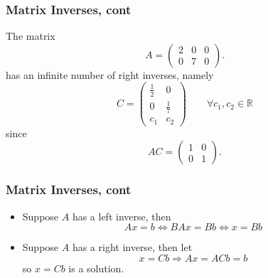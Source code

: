 \documentclass{beamer}
\begin{document}
\begin{frame}\frametitle{Matrix Inverses, cont}
	
	\begin{example}
		The matrix
		\[ A = \begin{pmatrix} 2 & 0 & 0\\ 0 & 7 & 0 \end{pmatrix}. \]
		has an infinite number of right inverses, namely
		\[ C = \begin{pmatrix} \frac{1}{2} & 0\\ 0 & \frac{1}{7}\\ c_1 & c_2 \end{pmatrix} 
			\qquad \forall c_1,c_2 \in \mathbb{R} \]
		since 
		\[
		AC = \begin{pmatrix} 1 & 0\\ 0 & 1 \end{pmatrix}.
		\]
	\end{example}
	
\end{frame}


\begin{frame}\frametitle{Matrix Inverses, cont}
	\begin{itemize} 
	\item 	Suppose $A$ has a left inverse, then 
	\[ Ax = b \iff BAx = Bb \iff x = Bb \]
	\item Suppose $A$ has a right inverse, then let
	\[ x = Cb \Rightarrow Ax = ACb = b\]
	so $x = Cb$ is a solution.
	\end{itemize}
\end{frame}
\end{document}
